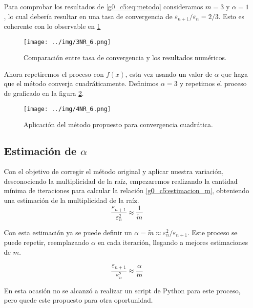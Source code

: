 \documentclass[../portafolio.tex]{subfiles}
\begin{document}
Para comprobar los resultados de \eqref{g0_c5:eq:metodo} consideramos $m=3$ y $\alpha=1$, lo cual debería resultar en una tasa de convergencia de $\varepsilon_{n+1}/\varepsilon_n =2/3$. Esto es coherente con lo observable en \ref{g0_c5:fig:graf_c2}


\begin{figure}
\centering
\texttt{[image: ../img/3NR\_6.png]}
\caption{Comparación entre tasa de convergencia y los resultados numéricos.} \label{g0_c5:fig:graf_c2}
\end{figure}


Ahora repetiremos el proceso con $f(x)$, esta vez usando un valor de $\alpha$  que haga que el método converja cuadráticamente. Definimos $\alpha=3$ y repetimos el proceso de graficado en la figura \ref{g0_c5:fig:graf_c3}.


\begin{figure}
\centering
\texttt{[image: ../img/4NR\_6.png]}
\caption{Aplicación del método propuesto para convergencia cuadrática.} \label{g0_c5:fig:graf_c3}
\end{figure}




\subsection{Estimación de $\alpha$}
Con el objetivo de corregir el método original y aplicar nuestra variación, desconociendo la multiplicidad de la raíz, empezaremos realizando la cantidad mínima de iteraciones para calcular la relación \eqref{g0_c5:estimacion_m}, obteniendo una estimación de la multiplicidad de la raíz. 
\begin{equation}\label{g0_c5:estimacion_m}
\frac{\varepsilon_{n+1}}{\varepsilon_n^2} \approx \frac{1}{\tilde{m}}
\end{equation}


Con esta estimación ya se puede definir un $\alpha= \tilde{m}\approx \varepsilon_n^2/\varepsilon_{n+1}$. Este proceso se puede repetir, reemplazando $\alpha$ en cada iteración, llegando a mejores estimaciones de $m$.


\begin{equation}
\frac{\varepsilon_{n+1}}{\varepsilon_n^2} \approx \frac{\alpha}{\tilde{m}}
\end{equation}


En esta ocasión no se alcanzó a realizar un script de Python para este proceso, pero quede este propuesto para otra oportunidad.
\end{document}
